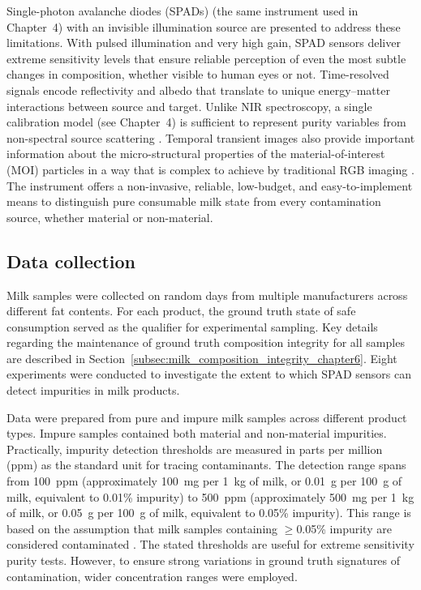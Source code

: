 \documentclass[12pt,a4paper,oneside]{report}
\begin{document}
Single-photon avalanche diodes (SPADs) (the same instrument used in Chapter~4) with an invisible illumination source are presented to address these limitations. With pulsed illumination and very high gain, SPAD sensors deliver extreme sensitivity levels that ensure reliable perception of even the most subtle changes in composition, whether visible to human eyes or not. Time-resolved signals encode reflectivity and albedo that translate to unique energy--matter interactions between source and target. Unlike NIR spectroscopy, a single calibration model (see Chapter~4) is sufficient to represent purity variables from non-spectral source scattering \cite{nielsen2013}. Temporal transient images also provide important information about the micro-structural properties of the material-of-interest (MOI) particles in a way that is complex to achieve by traditional RGB imaging \cite{su2016}. The instrument offers a non-invasive, reliable, low-budget, and easy-to-implement means to distinguish pure consumable milk state from every contamination source, whether material or non-material.

\subsection{Data collection}
\label{subsec:data_collection_chapter6}

Milk samples were collected on random days from multiple manufacturers across different fat contents. For each product, the ground truth state of safe consumption served as the qualifier for experimental sampling. Key details regarding the maintenance of ground truth composition integrity for all samples are described in Section~\ref{subsec:milk_composition_integrity_chapter6}. Eight experiments were conducted to investigate the extent to which SPAD sensors can detect impurities in milk products.

Data were prepared from pure and impure milk samples across different product types. Impure samples contained both material and non-material impurities. Practically, impurity detection thresholds are measured in parts per million (ppm) as the standard unit for tracing contaminants. The detection range spans from 100~ppm (approximately 100~mg per 1~kg of milk, or 0.01~g per 100~g of milk, equivalent to 0.01\% impurity) to 500~ppm (approximately 500~mg per 1~kg of milk, or 0.05~g per 100~g of milk, equivalent to 0.05\% impurity). This range is based on the assumption that milk samples containing $\geq$0.05\% impurity are considered contaminated \cite{goodman1986}. The stated thresholds are useful for extreme sensitivity purity tests. However, to ensure strong variations in ground truth signatures of contamination, wider concentration ranges were employed.
\end{document}

